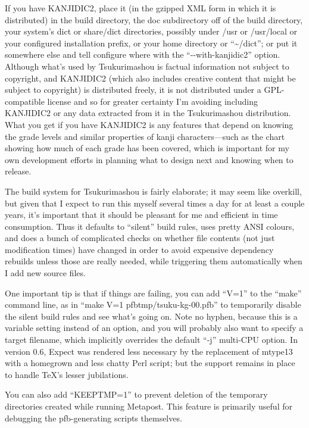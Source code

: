 \documentclass[14pt]{extarticle}
\begin{document}
If you have KANJIDIC2, place it (in the gzipped XML form in which it is
distributed) in the build directory, the doc subdirectory off of the build
directory, your system's dict or share/dict directories, possibly under
/usr or /usr/local or your configured installation prefix, or your home
directory or ``\textasciitilde/dict''; or put it
somewhere else and tell configure where with the ``-{}-with-kanjidic2''
option.  Although what's used by Tsukurimashou is factual information not
subject to copyright, and KANJIDIC2 (which also includes creative content
that might be subject to copyright) is distributed freely, it is not
distributed under a GPL-compatible license and so for greater certainty I'm
avoiding including KANJIDIC2 or any data extracted from it in the
Tsukurimashou distribution.  What you get if you have KANJIDIC2 is any
features that depend on knowing the grade levels and similar properties of
kanji characters---such as the chart showing how much of each grade has been
covered, which is important for my own development efforts in planning what
to design next and knowing when to release.

The build system for Tsukurimashou is fairly elaborate; it may seem like
overkill, but given that I expect to run this myself several times a day for
at least a couple years, it's important that it should be pleasant for me and
efficient in time consumption.  Thus it defaults to ``silent'' build rules,
uses pretty ANSI colours, and does a bunch of complicated checks on whether
file contents (not just modification times) have changed in order to avoid
expensive dependency rebuilds unless those are really needed, while
triggering them automatically when I add new source files.

One important tip is that if things are failing, you can add ``V=1'' to the
``make'' command line, as in ``make V=1 pfbtmp/tsuku-kg-00.pfb'' to
temporarily disable the silent build rules and see what's going on.  Note no
hyphen, because this is a variable setting instead of an option, and you
will probably also want to specify a target filename, which implicitly
overrides the default ``-j'' multi-CPU option.  In version 0.6, Expect was
rendered less necessary by the replacement of mtype13 with a homegrown and
less chatty Perl script; but the support remains in place to handle \TeX's
lesser jubilations.

You can also add ``KEEPTMP=1'' to prevent deletion of the temporary
directories created while running Metapost.  This feature is primarily
useful for debugging the pfb-generating scripts themselves.
\end{document}
